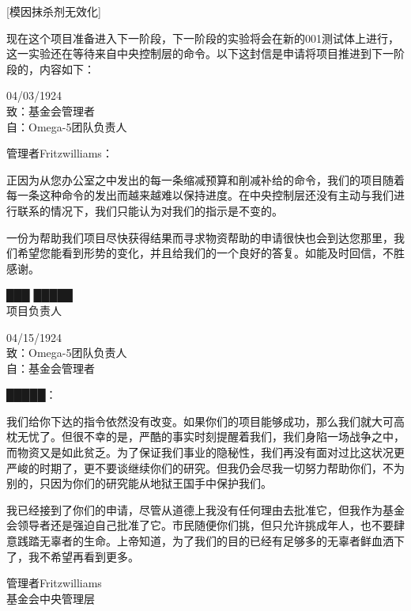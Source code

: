 \begin{scpboxc}
{[模因抹杀剂无效化]}
\end{scpboxc}

\begin{scpboxbbwm}


现在这个项目准备进入下一阶段，下一阶段的实验将会在新的001测试体上进行，这一实验还在等待来自中央控制层的命令。以下这封信是申请将项目推进到下一阶段的，内容如下：

\begin{scpbox}

04/03/1924 \\
致：基金会管理者 \\
自：Omega-5团队负责人

管理者Fritzwilliams：

正因为从您办公室之中发出的每一条缩减预算和削减补给的命令，我们的项目随着每一条这种命令的发出而越来越难以保持进度。在中央控制层还没有主动与我们进行联系的情况下，我们只能认为对我们的指示是不变的。

一份为帮助我们项目尽快获得结果而寻求物资帮助的申请很快也会到达您那里，我们希望您能看到形势的变化，并且给我们的一个良好的答复。如能及时回信，不胜感谢。

███ █████ \\
项目负责人

\end{scpbox}

04/15/1924 \\
致：Omega-5团队负责人 \\
自：基金会管理者

█████：

我们给你下达的指令依然没有改变。如果你们的项目能够成功，那么我们就大可高枕无忧了。但很不幸的是，严酷的事实时刻提醒着我们，我们身陷一场战争之中，而物资又是如此贫乏。为了保证我们事业的隐秘性，我们再没有面对过比这状况更严峻的时期了，更不要谈继续你们的研究。但我仍会尽我一切努力帮助你们，不为别的，只因为你们的研究能从地狱王国手中保护我们。

我已经接到了你们的申请，尽管从道德上我没有任何理由去批准它，但我作为基金会领导者还是强迫自己批准了它。市民随便你们挑，但只允许挑成年人，也不要肆意践踏无辜者的生命。上帝知道，为了我们的目的已经有足够多的无辜者鲜血洒下了，我不希望再看到更多。

管理者Fritzwilliams \\
基金会中央管理层

\end{scpboxbbwm}


